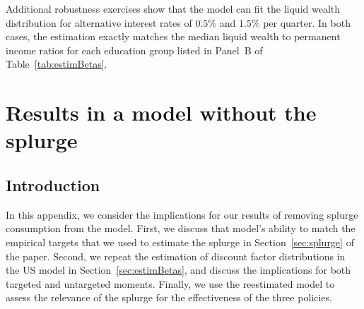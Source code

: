 \documentclass{econsocart}
\begin{document}

\whenstandalone{%
  \setcounter{section}{1}  %
}

Additional robustness exercises show that the model can fit the liquid wealth distribution for alternative interest rates of $0.5\%$ and $1.5\%$ per quarter. In both cases, the estimation exactly matches the median liquid wealth to permanent income ratios for each education group listed in Panel~B of Table~\ref{tab:estimBetas}.
\section{Results in a model without the splurge}
\whenintegrated{\label{app:Model-without-splurge}} %

\subsection{Introduction}
\whenintegrated{\label{app:Model-without-splurge-intro}} %

In this appendix, we consider the implications for our results of removing splurge consumption from the model. First, we discuss that model's ability to match the empirical targets that we used to estimate the splurge in Section~\ref{sec:splurge} of the paper. Second, we repeat the estimation of discount factor distributions in the US model in Section~\ref{sec:estimBetas}, and discuss the implications for both targeted and untargeted moments. Finally, we use the reestimated model to assess the relevance of the splurge for the effectiveness of the three policies.
\end{document}
